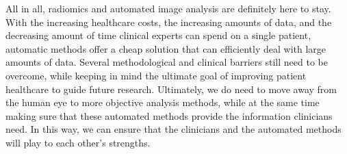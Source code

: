 All in all, radiomics and automated image analysis are definitely here to stay.
With the increasing healthcare costs, the increasing amounts of data, and the decreasing amount of time clinical experts can spend on a single patient, automatic methods offer a cheap solution that can efficiently deal with large amounts of data.
Several methodological and clinical barriers still need to be overcome, while keeping in mind the ultimate goal of improving patient healthcare to guide future research.
Ultimately, we do need to move away from the human eye to more objective analysis methods, while at the same time making sure that these automated methods provide the information clinicians need.
In this way, we can ensure that the clinicians and the automated methods will play to each other's strengths.
